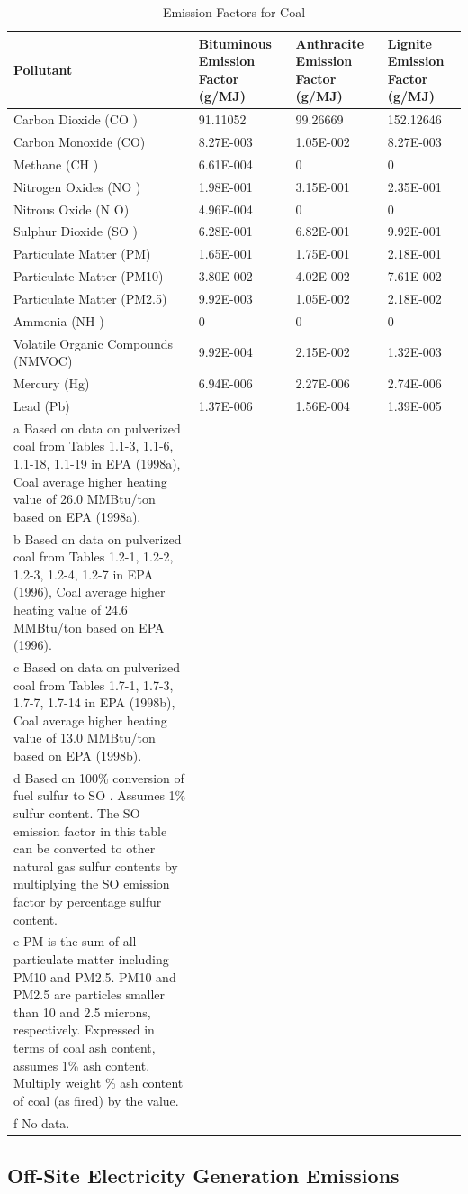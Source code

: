 \begin{longtable}[c]{p{1.5in}p{1.5in}p{1.5in}p{1.5in}}
\caption{  Emission Factors for Coal \protect \label{table:emission-factors-for-coal}}\\
\toprule 
Pollutant & Bituminous Emission Factor   (g/MJ) & Anthracite Emission Factor   (g/MJ) & Lignite Emission Factor   (g/MJ) \tabularnewline \midrule
\endhead
Carbon Dioxide (CO  ) & 91.11052 & 99.26669 & 152.12646 \tabularnewline
Carbon Monoxide (CO) & 8.27E-003 & 1.05E-002 & 8.27E-003 \tabularnewline
Methane (CH  ) & 6.61E-004 & 0 & 0 \tabularnewline
Nitrogen Oxides (NO  ) & 1.98E-001 & 3.15E-001 & 2.35E-001 \tabularnewline
Nitrous Oxide (N  O) & 4.96E-004 & 0 & 0 \tabularnewline
Sulphur Dioxide (SO  ) & 6.28E-001 & 6.82E-001 & 9.92E-001 \tabularnewline
Particulate Matter (PM) & 1.65E-001 & 1.75E-001 & 2.18E-001 \tabularnewline
Particulate Matter (PM10) & 3.80E-002 & 4.02E-002 & 7.61E-002 \tabularnewline
Particulate Matter (PM2.5) & 9.92E-003 & 1.05E-002 & 2.18E-002 \tabularnewline
Ammonia (NH  ) & 0 & 0 & 0 \tabularnewline
Volatile Organic Compounds (NMVOC) & 9.92E-004 & 2.15E-002 & 1.32E-003 \tabularnewline
Mercury (Hg) & 6.94E-006 & 2.27E-006 & 2.74E-006 \tabularnewline
Lead (Pb) & 1.37E-006 & 1.56E-004 & 1.39E-005 \tabularnewline
a Based on data on pulverized coal from Tables 1.1-3, 1.1-6, 1.1-18, 1.1-19 in EPA (1998a), Coal average higher heating value of 26.0 MMBtu/ton based on EPA (1998a). \tabularnewline
b Based on data on pulverized coal from Tables 1.2-1, 1.2-2, 1.2-3, 1.2-4, 1.2-7 in EPA (1996), Coal average higher heating value of 24.6 MMBtu/ton based on EPA (1996). \tabularnewline
c Based on data on pulverized coal from Tables 1.7-1, 1.7-3, 1.7-7, 1.7-14 in EPA (1998b), Coal average higher heating value of 13.0 MMBtu/ton based on EPA (1998b). \tabularnewline
d Based on 100\% conversion of fuel sulfur to SO  . Assumes 1\% sulfur content. The SO   emission factor in this table can be converted to other natural gas sulfur contents by multiplying the SO   emission factor by percentage sulfur content. \tabularnewline
e PM is the sum of all particulate matter including PM10 and PM2.5. PM10 and PM2.5 are particles smaller than 10 and 2.5 microns, respectively. Expressed in terms of coal ash content, assumes 1\% ash content. Multiply weight \% ash content of coal (as fired) by the value. \tabularnewline
f No data. \tabularnewline
\bottomrule
\end{longtable}

\subsection{Off-Site Electricity Generation Emissions}\label{off-site-electricity-generation-emissions}

